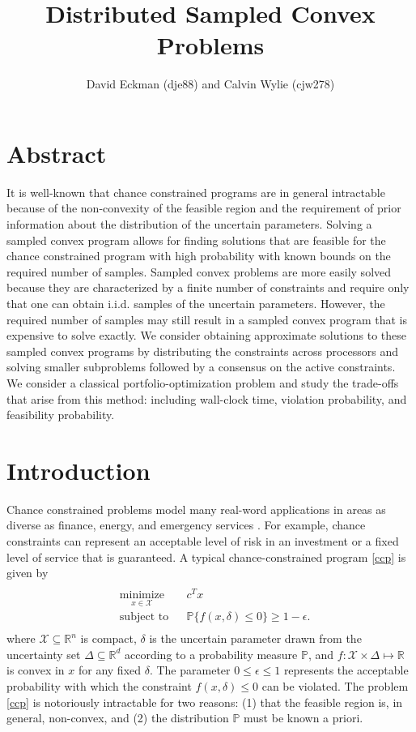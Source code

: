 \documentclass[12pt]{article}
\title{Distributed Sampled Convex Problems}
\author{David Eckman (dje88) and Calvin Wylie (cjw278)}
\date{}
\begin{document}
\setlength{\parindent}{24pt}

\maketitle

\section*{Abstract}
It is well-known that chance constrained programs are in general intractable because of the non-convexity of the feasible region and the requirement of prior information about the distribution of the uncertain parameters.
Solving a sampled convex program allows for finding solutions that are feasible for the chance constrained program with high probability with known bounds on the required number of samples.
Sampled convex problems are more easily solved because they are characterized by a finite number of constraints and require only that one can obtain i.i.d. samples of the uncertain parameters.
However, the required number of samples may still result in a sampled convex program that is expensive to solve exactly.
We consider obtaining approximate solutions to these sampled convex programs by distributing the constraints across processors and solving smaller subproblems followed by a consensus on the active constraints.
We consider a classical portfolio-optimization problem and study the trade-offs that arise from this method: including wall-clock time, violation probability, and feasibility probability.

\section*{Introduction}
Chance constrained problems model many real-word applications in areas as diverse as finance, energy, and emergency services \cite{bental09}.
For example, chance constraints can represent an acceptable level of risk in an investment or a fixed level of service that is guaranteed.
A typical chance-constrained program \ref{ccp} is given by
\begin{align}\label{ccp}
\begin{split}
\begin{aligned}
    & \underset{x \in \mathcal{X}}{\text{minimize}}
    & & c^T x \\
    & \text{subject to}
    & & \mathbb{P}\{f(x,\delta) \leq 0\} \geq 1-\epsilon.
\end{aligned}
\end{split} \tag{CCP$_\epsilon$}
\end{align}
where $\mathcal{X} \subseteq \mathbb{R}^n$ is compact, $\delta$ is the uncertain parameter drawn from the uncertainty set $\Delta \subseteq \mathbb{R}^d$ according to a probability measure $\mathbb{P}$, and $f:\mathcal{X} \times \Delta \mapsto \mathbb{R}$ is convex in $x$ for any fixed $\delta$.
The parameter $0 \leq \epsilon \leq 1$ represents the acceptable probability with which the constraint $f(x,\delta) \leq 0$ can be violated.
The problem \ref{ccp} is notoriously intractable for two reasons: (1) that the feasible region is, in general, non-convex, and (2) the distribution $\mathbb{P}$ must be known a priori.
\end{document}

